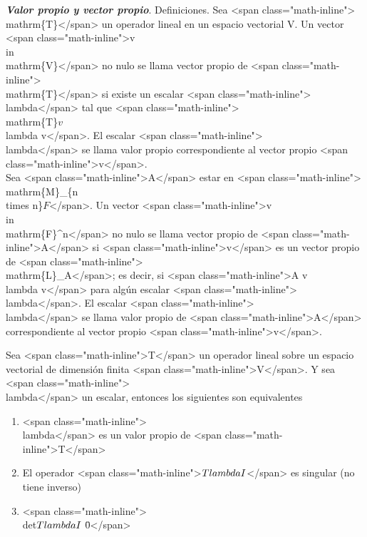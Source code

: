 \documentclass{report}
\begin{document}
    \begin{defBox}
        \textit{\textbf{Valor propio y vector propio}}. Definiciones. Sea <span class="math-inline">\\mathrm\{T\}</span> un operador lineal en un espacio vectorial V. Un vector <span class="math-inline">v \\in \\mathrm\{V\}</span> no nulo se llama vector propio de <span class="math-inline">\\mathrm\{T\}</span> si existe un escalar <span class="math-inline">\\lambda</span> tal que <span class="math-inline">\\mathrm\{T\}\(v\)\=\\lambda v</span>. El escalar <span class="math-inline">\\lambda</span> se llama valor propio correspondiente al vector propio <span class="math-inline">v</span>.\\

        Sea <span class="math-inline">A</span> estar en <span class="math-inline">\\mathrm\{M\}\_\{n \\times n\}\(F\)</span>. Un vector <span class="math-inline">v \\in \\mathrm\{F\}^n</span> no nulo se llama vector propio de <span class="math-inline">A</span> si <span class="math-inline">v</span> es un vector propio de <span class="math-inline">\\mathrm\{L\}\_A</span>; es decir, si <span class="math-inline">A v\=\\lambda v</span> para algún escalar <span class="math-inline">\\lambda</span>. El escalar <span class="math-inline">\\lambda</span> se llama valor propio de <span class="math-inline">A</span> correspondiente al vector propio <span class="math-inline">v</span>.
    \end{defBox}

    \begin{thBox}
        Sea <span class="math-inline">T</span> un operador lineal sobre un espacio vectorial de dimensión finita <span class="math-inline">V</span>. Y sea <span class="math-inline">\\lambda</span> un escalar, entonces los siguientes son equivalentes

        \begin{enumerate}
            \item <span class="math-inline">\\lambda</span> es un valor propio de <span class="math-inline">T</span>
            \item El operador <span class="math-inline">\(T \- \\lambda I\)</span> es singular (no tiene inverso)
            \item <span class="math-inline">\\det\(T\-\\lambda I\) \= 0</span>
        \end{enumerate}
    \end{thBox}
\end{document}
